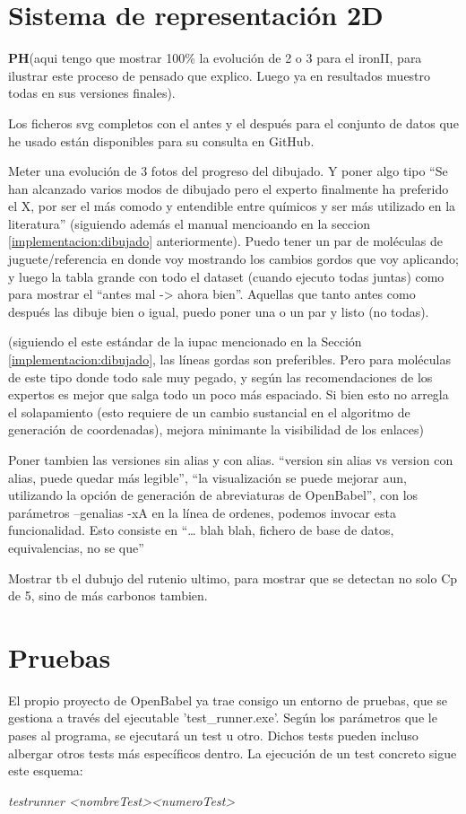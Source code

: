 \section{Sistema de representación 2D}

\textbf{PH}(aqui tengo que mostrar 100\% la evolución de 2 o 3 para el ironII, para ilustrar este proceso de pensado que explico. Luego ya en resultados muestro todas en sus versiones finales). 


Los ficheros svg completos con el antes y el después para el conjunto de datos que he usado están disponibles para su consulta en GitHub.

Meter una evolución de 3 fotos del progreso del dibujado. Y poner algo tipo “Se han alcanzado varios modos de dibujado pero el experto finalmente ha preferido el X, por ser el más comodo y entendible entre químicos y ser más utilizado en la literatura” (siguiendo además el manual mencioando en la seccion \ref{implementacion:dibujado} anteriormente). Puedo tener un par de moléculas de juguete/referencia en donde voy mostrando los cambios gordos que voy aplicando; y luego la tabla grande con todo el dataset (cuando ejecuto todas juntas) como para mostrar el “antes mal -> ahora bien”. Aquellas que tanto antes como después las dibuje bien o igual, puedo poner una o un par y listo (no todas).

(siguiendo el este estándar de la iupac mencionado en la Sección \ref{implementacion:dibujado}, las líneas gordas son preferibles. Pero para moléculas de este tipo donde todo sale muy pegado, y según las recomendaciones de los expertos es mejor que salga todo un poco más espaciado. Si bien esto no arregla el solapamiento (esto requiere de un cambio sustancial en el algoritmo de generación de coordenadas), mejora minimante la visibilidad de los enlaces)

Poner tambien las versiones sin alias y con alias. “version sin alias vs version con alias, puede quedar más legible”, “la visualización se puede mejorar aun, utilizando la opción de generación de abreviaturas de OpenBabel”, con los parámetros --genalias -xA en la línea de ordenes, podemos invocar esta funcionalidad. Esto consiste en “… blah blah, fichero de base de datos, equivalencias, no se que”

Mostrar tb el dubujo del rutenio ultimo, para mostrar que se detectan no solo Cp de 5, sino de más carbonos tambien.

\section{Pruebas}
El propio proyecto de OpenBabel ya trae consigo un entorno de pruebas, que se gestiona a través del ejecutable 'test\_runner.exe'. Según los parámetros que le pases al programa, se ejecutará un test u otro. Dichos tests pueden incluso albergar otros tests más específicos dentro. La ejecución de un test concreto sigue este esquema: 
\begin{center}
    \textit{test\textunderscore runner \textless nombreTest\textgreater  \textless numeroTest\textgreater}    
\end{center}

